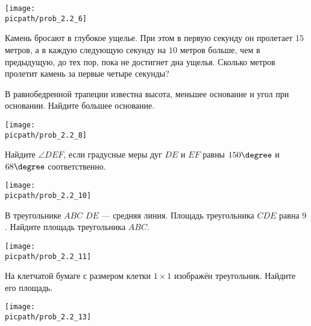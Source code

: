 \begin{training}[1]
\begin{listofex}[resume]
		\begin{center}
			\texttt{[image: \\picpath/prob\_2.2\_6]}
		\end{center}
		\foranswer
		\item Камень бросают в глубокое ущелье. При этом в первую секунду он пролетает \( 15 \) метров, а в каждую следующую секунду на \( 10 \) метров больше, чем в предыдущую, до тех пор, пока не достигнет дна ущелья. Сколько метров пролетит камень за первые четыре секунды?
		\foranswer
		\item \begin{minipage}[t]{\bodywidth}
			В равнобедренной трапеции известна высота, меньшее основание и угол при основании. Найдите большее основание.
			\foranswer
		\end{minipage}
		\gapwidth
		\begin{minipage}[t]{\picwidth}
			\texttt{[image: \\picpath/prob\_2.2\_8]}
		\end{minipage}
		\item \begin{minipage}[t]{\bodywidth}
			Найдите \( \angle DEF \), если градусные меры дуг \( DE \) и \( EF \) равны \( 150\degree \) и \( 68\degree \) соответственно.
			\foranswer
		\end{minipage}
		\gapwidth
		\begin{minipage}[t]{\picwidth}
			\texttt{[image: \\picpath/prob\_2.2\_10]}
		\end{minipage}
		\item \begin{minipage}[t]{\bodywidth}
		В треугольнике \( ABC \) \( DE \) --- средняя линия. Площадь треугольника \( CDE \) равна \( 9 \). Найдите площадь треугольника \( ABC \).
			\foranswer
		\end{minipage}
		\gapwidth
		\begin{minipage}[t]{\picwidth}
			\texttt{[image: \\picpath/prob\_2.2\_11]}
		\end{minipage}
		\item \begin{minipage}[t]{\bodywidth}
			На клетчатой бумаге с размером клетки \( 1\times1 \) изображён треугольник. Найдите его площадь.
			\foranswer
		\end{minipage}
		\gapwidth
		\begin{minipage}[t]{\picwidth}
			\texttt{[image: \\picpath/prob\_2.2\_13]}
		\end{minipage}

\end{listofex}
\end{training}
